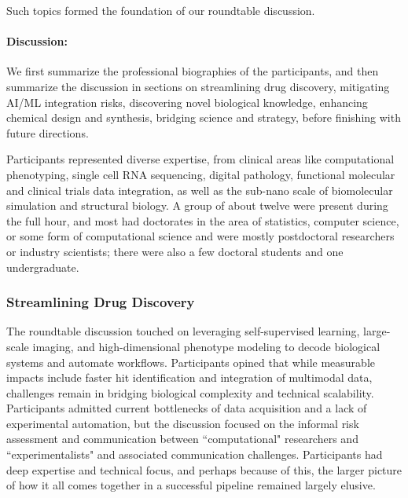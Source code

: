 Such topics formed the foundation of our roundtable discussion.

\paragraph{Discussion:}
We first summarize the professional biographies of the participants, and then summarize the discussion in sections on streamlining drug discovery, mitigating AI/ML integration risks, discovering novel biological knowledge, enhancing chemical design and synthesis, bridging science and strategy, before finishing with future directions.

Participants represented diverse expertise, from clinical areas like computational phenotyping, single cell RNA sequencing, digital pathology, functional molecular and clinical trials data integration, as well as the sub-nano scale of biomolecular simulation and structural biology. A group of about twelve were present during the full hour, and most had doctorates in the area of statistics, computer science, or some form of computational science and were mostly postdoctoral researchers or industry scientists; there were also a few doctoral students and one undergraduate.

\subsubsection{Streamlining Drug Discovery}  
The roundtable discussion touched on leveraging self-supervised learning, large-scale imaging, and high-dimensional phenotype modeling to decode biological systems and automate workflows. Participants opined that while measurable impacts include faster hit identification and integration of multimodal data, challenges remain in bridging biological complexity and technical scalability. Participants admitted current bottlenecks of data acquisition and a lack of experimental automation, but the discussion focused on the informal risk assessment and communication between ``computational" researchers and ``experimentalists" and associated communication challenges. Participants had deep expertise and technical focus, and perhaps because of this, the larger picture of how it all comes together in a successful pipeline remained largely elusive.   

